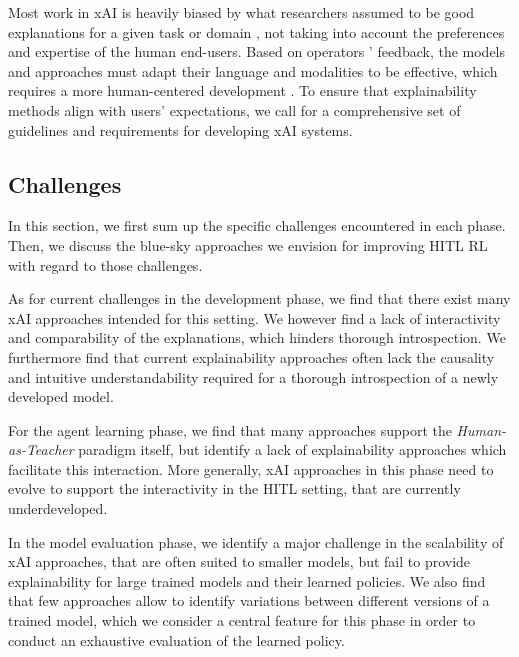 \documentclass[twoside,11pt]{article}
\newcommand{\sd}[1]{\textcolor{red}{[#1 \textsc{--Srijita}]}}
\begin{document}

Most work in xAI is heavily biased by what researchers assumed to be good explanations for a given task or domain \citep{Miller:2019:xAISocialSciencesInsights}, not taking into account the preferences and expertise of the human end-users. Based on operators ' feedback, the models and approaches must adapt their language and modalities to be effective, which requires a more human-centered development \citep{PuiuttaVeith:2020:xAIRLSurvey}. To ensure that explainability methods align with users' expectations, we call for a comprehensive set of guidelines and requirements for developing xAI systems. 



\subsection{Challenges}
\label{sec:ThirdGeneration}

In this section, we first sum up the specific challenges encountered in each phase. Then, we discuss the blue-sky approaches we envision for improving HITL RL with regard to those challenges.

As for current challenges in the development phase, we find that there exist many xAI approaches intended for this setting. We however find a lack of interactivity and comparability of the explanations, which hinders thorough introspection. We furthermore find that current explainability approaches often lack the causality and intuitive understandability required for a thorough introspection of a newly developed model.

For the agent learning phase, we find that many approaches support the \emph{Human-as-Teacher} paradigm itself, but identify a lack of explainability approaches which facilitate this interaction. More generally, xAI approaches in this phase need to evolve to support the interactivity in the HITL setting, that are currently underdeveloped.

In the model evaluation phase, we identify a major challenge in the scalability of xAI approaches, that are often suited to smaller models, but fail to provide explainability for large trained models and their learned policies. We also find that few approaches allow to identify variations between different versions of a trained model, which we consider a central feature for this phase in order to conduct an exhaustive evaluation of the learned policy.
\end{document}
